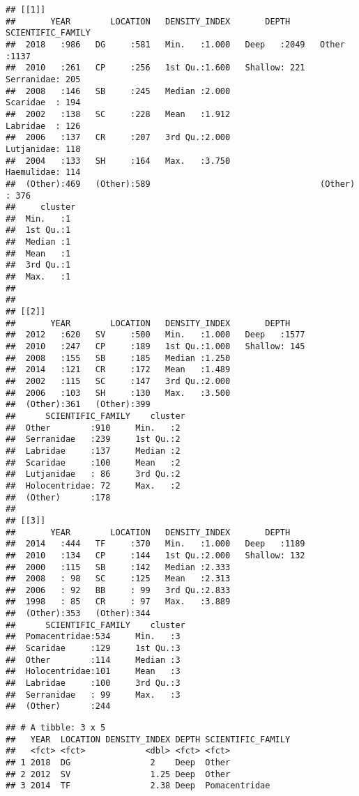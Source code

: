 \documentclass[
]{article}
\begin{document}
\begin{verbatim}
## [[1]]
##       YEAR        LOCATION   DENSITY_INDEX       DEPTH       SCIENTIFIC_FAMILY
##  2018   :986   DG     :581   Min.   :1.000   Deep   :2049   Other     :1137   
##  2010   :261   CP     :256   1st Qu.:1.600   Shallow: 221   Serranidae: 205   
##  2008   :146   SB     :245   Median :2.000                  Scaridae  : 194   
##  2002   :138   SC     :228   Mean   :1.912                  Labridae  : 126   
##  2006   :137   CR     :207   3rd Qu.:2.000                  Lutjanidae: 118   
##  2004   :133   SH     :164   Max.   :3.750                  Haemulidae: 114   
##  (Other):469   (Other):589                                  (Other)   : 376   
##     cluster 
##  Min.   :1  
##  1st Qu.:1  
##  Median :1  
##  Mean   :1  
##  3rd Qu.:1  
##  Max.   :1  
##             
## 
## [[2]]
##       YEAR        LOCATION   DENSITY_INDEX       DEPTH     
##  2012   :620   SV     :500   Min.   :1.000   Deep   :1577  
##  2010   :247   CP     :189   1st Qu.:1.000   Shallow: 145  
##  2008   :155   SB     :185   Median :1.250                 
##  2014   :121   CR     :172   Mean   :1.489                 
##  2002   :115   SC     :147   3rd Qu.:2.000                 
##  2006   :103   SH     :130   Max.   :3.500                 
##  (Other):361   (Other):399                                 
##      SCIENTIFIC_FAMILY    cluster 
##  Other        :910     Min.   :2  
##  Serranidae   :239     1st Qu.:2  
##  Labridae     :137     Median :2  
##  Scaridae     :100     Mean   :2  
##  Lutjanidae   : 86     3rd Qu.:2  
##  Holocentridae: 72     Max.   :2  
##  (Other)      :178                
## 
## [[3]]
##       YEAR        LOCATION   DENSITY_INDEX       DEPTH     
##  2014   :444   TF     :370   Min.   :1.000   Deep   :1189  
##  2010   :134   CP     :144   1st Qu.:2.000   Shallow: 132  
##  2000   :115   SB     :142   Median :2.333                 
##  2008   : 98   SC     :125   Mean   :2.313                 
##  2006   : 92   BB     : 99   3rd Qu.:2.833                 
##  1998   : 85   CR     : 97   Max.   :3.889                 
##  (Other):353   (Other):344                                 
##      SCIENTIFIC_FAMILY    cluster 
##  Pomacentridae:534     Min.   :3  
##  Scaridae     :129     1st Qu.:3  
##  Other        :114     Median :3  
##  Holocentridae:101     Mean   :3  
##  Labridae     :100     3rd Qu.:3  
##  Serranidae   : 99     Max.   :3  
##  (Other)      :244
\end{verbatim}

\begin{verbatim}
## # A tibble: 3 x 5
##   YEAR  LOCATION DENSITY_INDEX DEPTH SCIENTIFIC_FAMILY
##   <fct> <fct>            <dbl> <fct> <fct>            
## 1 2018  DG                2    Deep  Other            
## 2 2012  SV                1.25 Deep  Other            
## 3 2014  TF                2.38 Deep  Pomacentridae
\end{verbatim}
\end{document}
